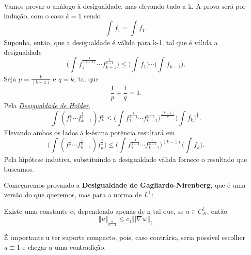 \documentclass[measure_theory.tex]{subfiles}
\begin{document}
\begin{proof*}
	Vamos provar o análogo à desigualdade, mas elevando tudo a k. A prova será por indução, com o caso \(k=1\) sendo
	\[
		\int_{}^{}f_{1}=\int_{}^{}f_{1}.
	\]
	Suponha, então, que a desigualdade é válida para k-1, tal que é válida a desigualdade
	\[
		\biggl(\int_{}^{}f_{1}^{\frac{1}{(k-1)}}\cdots f_{k-1}^{\frac{1}{k-1}}\biggr) \leq \biggl(\int_{}^{}f_{1}\biggr)\cdots \biggl(\int_{}^{}f_{k-1}\biggr).
	\]
	Seja \(p=\frac{k}{(k-1)}\) e \(q=k\), tal que
	\[
		\frac{1}{p}+\frac{1}{q}=1.
	\]
	Pela \hyperlink{holder}{\textit{Desigualdade de Hölder}},
	\[
		\int_{}^{}(f_{1}^{\frac{1}{k}}\cdots f_{k-1}^{\frac{1}{k}})f_{k}^{\frac{1}{k}}\leq \biggl(\int_{}^{}f_{1}^{\frac{1}{k-1}}\cdots f_{k-1}^{\frac{1}{k-1}}\biggr)^{\frac{(k-1)}{k}}\biggl(\int_{}^{}f_{k}\biggr)^{\frac{1}{k}}.
	\]
	Elevando ambos os lados à k-ésima potência resultará em
	\[
		\biggl(\int_{}^{}(f_{1}^{\frac{1}{k}}\cdots f_{k-1}^{\frac{1}{k}})f_{k}^{\frac{1}{k}}\biggr)\leq \biggl(\int_{}^{}f_{1}^{\frac{1}{k-1}}\cdots f_{k-1}^{\frac{1}{k-1}}\biggr)^{(k-1)}\biggl(\int_{}^{}f_{k}\biggr).
	\]
	Pela hipótese indutiva, substituindo a desigualdade válida fornece o resultado que buscamos. \qedsymbol
\end{proof*}
Começaremos provando a \textbf{Desigualdade de Gagliardo-Nirenberg}, que é uma versão do que queremos, mas para a norma de \(L^{1}\):
\hypertarget{gagliardo-nirenberg-inequality}{
	\begin{theorem*}
		Existe uma constante \(c_{1}\) dependendo apenas de n tal que, se \(u\in C_{K}^{1}\), então
		\[
			\Vert u \Vert_{\frac{n}{n-1}}\leq c_{1}\Vert |\nabla u| \Vert_{1}
		\]
	\end{theorem*}
}
É importante u ter suporte compacto, pois, caso contrário, seria possível escolher \(u\equiv 1\) e chegar a uma contradição.
\end{document}
